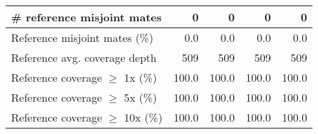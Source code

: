 \documentclass[12pt,a4paper]{article}
\begin{document}
\begin{table}[ht]
\begin{center}
\begin{tabular}{|l*{4}{|r}|}
\# reference misjoint mates & 0 & 0 & 0 & 0 \\ \hline
Reference misjoint mates (\%) & 0.0 & 0.0 & 0.0 & 0.0 \\ \hline
Reference avg. coverage depth & 509 & 509 & 509 & 509 \\ \hline
Reference coverage $\geq$ 1x (\%) & 100.0 & 100.0 & 100.0 & 100.0 \\ \hline
Reference coverage $\geq$ 5x (\%) & 100.0 & 100.0 & 100.0 & 100.0 \\ \hline
Reference coverage $\geq$ 10x (\%) & 100.0 & 100.0 & 100.0 & 100.0 \\ \hline
\end{tabular}
\end{center}
\end{table}
\end{document}
